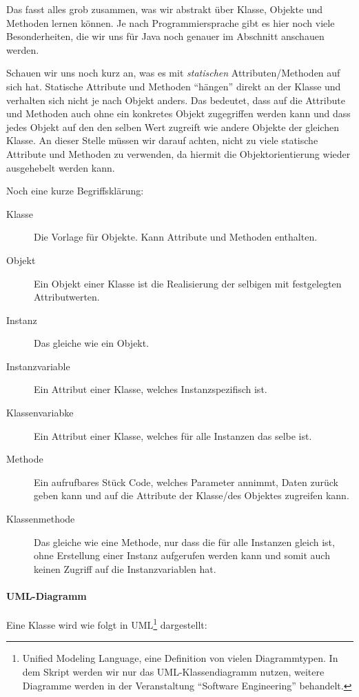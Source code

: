 	Das fasst alles grob zusammen, was wir abstrakt über Klasse, Objekte und Methoden lernen können. Je nach Programmiersprache gibt es hier noch viele Besonderheiten, die wir uns für Java noch genauer im Abschnitt  anschauen werden.
	
	Schauen wir uns noch kurz an, was es mit \textit{statischen} Attributen/Methoden auf sich hat. Statische Attribute und Methoden \enquote{hängen} direkt an der Klasse und verhalten sich nicht je nach Objekt anders. Das bedeutet, dass auf die Attribute und Methoden auch ohne ein konkretes Objekt zugegriffen werden kann und dass jedes Objekt auf den den selben Wert zugreift wie andere Objekte der gleichen Klasse. An dieser Stelle müssen wir darauf achten, nicht zu viele statische Attribute und Methoden zu verwenden, da hiermit die Objektorientierung wieder ausgehebelt werden kann.
	
	Noch eine kurze Begriffsklärung:
	\begin{description}
		\item[Klasse] Die Vorlage für Objekte. Kann Attribute und Methoden enthalten.
		\item[Objekt] Ein Objekt einer Klasse ist die Realisierung der selbigen mit festgelegten Attributwerten.
		\item[Instanz] Das gleiche wie ein Objekt.
		\item[Instanzvariable] Ein Attribut einer Klasse, welches Instanzspezifisch ist.
		\item[Klassenvariabke] Ein Attribut einer Klasse, welches für alle Instanzen das selbe ist.
		\item[Methode] Ein aufrufbares Stück Code, welches Parameter annimmt, Daten zurück geben kann und auf die Attribute der Klasse/des Objektes zugreifen kann.
		\item[Klassenmethode] Das gleiche wie eine Methode, nur dass die für alle Instanzen gleich ist, ohne Erstellung einer Instanz aufgerufen werden kann und somit auch keinen Zugriff auf die Instanzvariablen hat.
	\end{description}

	\paragraph{UML-Diagramm}
		Eine Klasse wird wie folgt in UML\footnote{Unified Modeling Language, eine Definition von vielen Diagrammtypen. In dem Skript werden wir nur das UML-Klassendiagramm nutzen, weitere Diagramme werden in der Veranstaltung \enquote{Software Engineering} behandelt.} dargestellt:
		\begin{figure}[H]
			\centering
		\end{figure}

